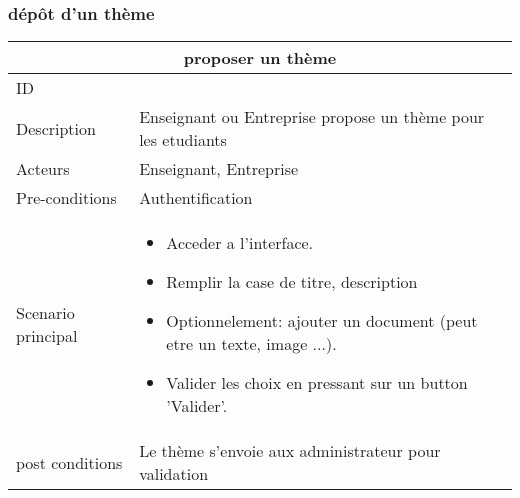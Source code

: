 \documentclass[11pt,fleqn]{book} %
\begin{document}
\subsubsection{dépôt d'un thème}
\begin{center}
\begin{tabularx}{1\textwidth} { | p{4cm} | >{\raggedright\arraybackslash}X |  }
  \hline
  \multicolumn{2}{|c|}{proposer un thème} \\
 \hline
 ID & 1  \\
 \hline
 Description  & Enseignant ou Entreprise propose un thème pour les etudiants \\
  \hline
 Acteurs  & Enseignant, Entreprise   \\
  \hline
 Pre-conditions  & Authentification\\
 \hline
 Scenario principal  &  
 \begin{itemize}
     \item  Acceder a l’interface.
     \item Remplir la case de titre, description
     \item Optionnelement: ajouter un document (peut etre un texte, image ...).
     \item Valider les choix en pressant sur un button ’Valider’.
 \end{itemize}\\
  \hline
 post conditions  &   Le thème s’envoie aux administrateur pour validation  \\
  \hline
\end{tabularx}
\label{tbl:nicetablelesstable}
\end{center}
\end{document}

